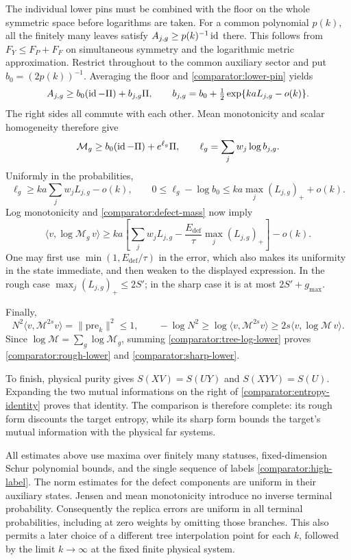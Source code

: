 The individual lower pins must be combined with the floor on the whole
symmetric space before logarithms are taken.  For a common polynomial
$p(k)$, all the finitely many leaves satisfy
$A_{j,g}\ge p(k)^{-1}\operatorname{id}$ there.  This follows from
$F_Y\le F_P+F_F$ on simultaneous symmetry and the logarithmic metric
approximation.  Restrict throughout to the common auxiliary sector and
put $b_0=(2p(k))^{-1}$.  Averaging the floor and
\eqref{comparator:lower-pin} yields
\[
 A_{j,g}\ge b_0(\operatorname{id}-\Pi)+b_{j,g}\Pi,
 \qquad b_{j,g}=b_0+\tfrac12\exp\{kaL_{j,g}-o(k)\}.
\]
The right sides all commute with each other.  Mean monotonicity and
scalar homogeneity therefore give
\[
 \mathcal M_g\ge b_0(\operatorname{id}-\Pi)+e^{\ell_g}\Pi,
 \qquad \ell_g=\sum_jw_j\log b_{j,g}.
\]
Uniformly in the probabilities,
\[
 \ell_g\ge ka\sum_jw_jL_{j,g}-o(k),\qquad
 0\le\ell_g-\log b_0
       \le ka\max_j(L_{j,g})_++o(k).
\]
Log monotonicity and \eqref{comparator:defect-mass} now imply
\begin{equation}
 \langle v,\log\mathcal M_g\,v\rangle
 \ge ka\left[\sum_jw_jL_{j,g}
       -\frac{E_{\mathrm{def}}}{\tau}\max_j(L_{j,g})_+\right]-o(k).
 \label{comparator:tree-log-lower}
\end{equation}
One may first use $\min(1,E_{\mathrm{def}}/\tau)$ in the error, which
also makes its uniformity in the state immediate, and then weaken to the
displayed expression.  In the rough case
$\max_j(L_{j,g})_+\le2S'$; in the sharp case it is at most
$2S'+g_{\max}$.

Finally,
\[
 N^2\langle v,\mathcal M^{2s}v\rangle=\|\mathrm{pre}_k\|^2\le1,
 \qquad
 -\log N^2\ge\log\langle v,\mathcal M^{2s}v\rangle
       \ge2s\langle v,\log\mathcal M\,v\rangle.
\]
Since $\log\mathcal M=\sum_g\log\mathcal M_g$, summing
\eqref{comparator:tree-log-lower} proves
\eqref{comparator:rough-lower} and \eqref{comparator:sharp-lower}.

To finish, physical purity gives
$S(XV)=S(UY)$ and $S(XYV)=S(U)$.  Expanding the two mutual informations
on the right of \eqref{comparator:entropy-identity} proves that identity.
The comparison is therefore complete: its rough form discounts the target
entropy, while its sharp form bounds the target's mutual information with
the physical far systems.

All estimates above use maxima over finitely many statuses, fixed-dimension
Schur polynomial bounds, and the single sequence of labels
\eqref{comparator:high-label}.  The norm estimates for the defect
components are uniform in their auxiliary states.  Jensen and mean
monotonicity introduce no inverse terminal probability.  Consequently the
replica errors are uniform in all terminal probabilities, including at
zero weights by omitting those branches.  This also permits a later choice
of a different tree interpolation point for each $k$, followed by the
limit $k\to\infty$ at the fixed finite physical system.
